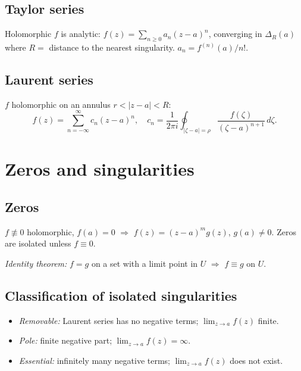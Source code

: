 \subsection{Taylor series}
\label{subsec:taylor-series-complex}

Holomorphic $f$ is analytic: $f(z)=\sum_{n\ge0}a_n(z-a)^n$, converging in $\Delta_R(a)$ where $R=$ distance to the nearest singularity. $a_n=f^{(n)}(a)/n!$.

\subsection{Laurent series}
\label{subsec:laurent-series}

$f$ holomorphic on an annulus $r<|z-a|<R$:
$$f(z)=\sum_{n=-\infty}^\infty c_n(z-a)^n,\quad c_n=\frac1{2\pi i}\oint_{|\zeta-a|=\rho}\frac{f(\zeta)}{(\zeta-a)^{n+1}}\,d\zeta.$$

\medskip

\section{Zeros and singularities}
\label{sec:singularities}

\subsection{Zeros}
\label{subsec:zeros-complex}

$f\not\equiv0$ holomorphic, $f(a)=0$ $\Rightarrow$ $f(z)=(z-a)^m g(z)$, $g(a)\neq0$. Zeros are isolated unless $f\equiv0$.

\textit{Identity theorem:} $f=g$ on a set with a limit point in $U$ $\Rightarrow$ $f\equiv g$ on $U$.

\subsection{Classification of isolated singularities}
\label{subsec:singularities-class}

\begin{itemize}
\item \textit{Removable:} Laurent series has no negative terms; $\lim_{z\to a}f(z)$ finite.
\item \textit{Pole:} finite negative part; $\lim_{z\to a}f(z)=\infty$.
\item \textit{Essential:} infinitely many negative terms; $\lim_{z\to a}f(z)$ does not exist.
\end{itemize}

